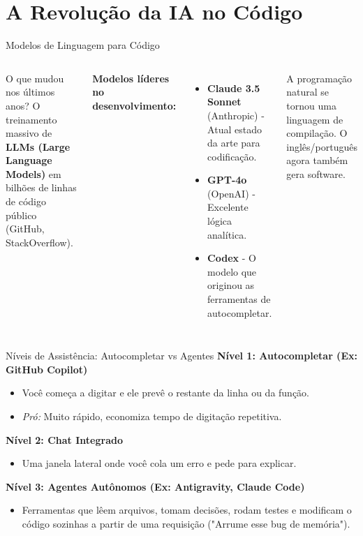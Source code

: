 \section{A Revolução da IA no Código}

\begin{frame}{Modelos de Linguagem para Código}
\begin{columns}
O que mudou nos últimos anos? O treinamento massivo de \textbf{LLMs (Large Language Models)} em bilhões de linhas de código público (GitHub, StackOverflow).

\vspace{0.3cm}
\textbf{Modelos líderes no desenvolvimento:}
\begin{itemize}
    \item \textbf{Claude 3.5 Sonnet} (Anthropic) - Atual estado da arte para codificação.
    \item \textbf{GPT-4o} (OpenAI) - Excelente lógica analítica.
    \item \textbf{Codex} - O modelo que originou as ferramentas de autocompletar.
\end{itemize}

\begin{center}
A programação natural se tornou uma linguagem de compilação. O inglês/português agora também gera software.
\end{center}
\end{columns}
\end{frame}

\begin{frame}{Níveis de Assistência: Autocompletar vs Agentes}
\textbf{Nível 1: Autocompletar (Ex: GitHub Copilot)}
\begin{itemize}
    \item Você começa a digitar e ele prevê o restante da linha ou da função.
    \item \textit{Pró:} Muito rápido, economiza tempo de digitação repetitiva.
\end{itemize}

\vspace{0.3cm}
\textbf{Nível 2: Chat Integrado}
\begin{itemize}
    \item Uma janela lateral onde você cola um erro e pede para explicar.
\end{itemize}

\vspace{0.3cm}
\textbf{Nível 3: Agentes Autônomos (Ex: Antigravity, Claude Code)}
\begin{itemize}
    \item Ferramentas que lêem arquivos, tomam decisões, rodam testes e modificam o código sozinhas a partir de uma requisição ("Arrume esse bug de memória").
\end{itemize}
\end{frame}

